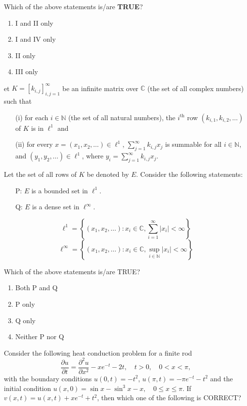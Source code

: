 Which of the above statements is/are \textbf{TRUE}?

\begin{enumerate}
    \item I and II only
    \item I and IV only
    \item II only
    \item III only
\end{enumerate}
\vspace{0.5cm}
\item et \( K = [k_{i,j}]_{i,j=1}^{\infty} \) be an infinite matrix over \( \mathbb{C} \) (the set of all complex numbers) such that
\begin{itemize}
    \item[(i)] for each \( i \in \mathbb{N} \) (the set of all natural numbers), the \( i^{\text{th}} \) row \( (k_{i,1}, k_{i,2}, \dots) \) of \( K \) is in \( \ell^1 \) and
    \item[(ii)] for every \( x = (x_1, x_2, \dots) \in \ell^1 \), \( \sum_{j=1}^{\infty} k_{i,j} x_j \) is summable for all \( i \in \mathbb{N} \), and \( (y_1, y_2, \dots) \in \ell^1 \), where \( y_i = \sum_{j=1}^{\infty} k_{i,j} x_j \).
\end{itemize}

Let the set of all rows of \( K \) be denoted by \( E \). Consider the following statements:
\begin{itemize}
    \item[P:] \( E \) is a bounded set in \( \ell^1 \).
    \item[Q:] \( E \) is a dense set in \( \ell^{\infty} \).
\end{itemize}

\[
\ell^1 = \left\{ (x_1, x_2, \dots): x_i \in \mathbb{C}, \sum_{i=1}^{\infty} |x_i| < \infty \right\}
\]
\[
\ell^{\infty} = \left\{ (x_1, x_2, \dots): x_i \in \mathbb{C}, \sup_{i \in \mathbb{N}} |x_i| < \infty \right\}
\]

Which of the above statements is/are TRUE?

\begin{enumerate}
    \item Both P and Q
    \item P only
    \item Q only
    \item Neither P nor Q
\end{enumerate}


\vspace{0.5cm}
\item Consider the following heat conduction problem for a finite rod
\[
\frac{\partial u}{\partial t} = \frac{\partial^2 u}{\partial x^2} - xe^{-t} - 2t, \quad t > 0, \quad 0 < x < \pi,
\]
with the boundary conditions \( u(0,t) = -t^2 \), \( u(\pi,t) = -\pi e^{-t} - t^2 \) and the initial condition \( u(x,0) = \sin x - \sin^3 x - x, \quad 0 \leq x \leq \pi \). If \( v(x,t) = u(x,t) + xe^{-t} + t^2 \), then which one of the following is CORRECT?

